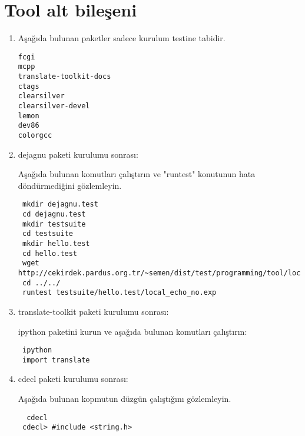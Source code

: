 \documentclass[a4paper,10pt]{article}
\begin{document}
\section{Tool alt bileşeni}
\begin{enumerate}
 \item Aşağıda bulunan paketler sadece kurulum testine tabidir.
\begin{verbatim}
fcgi
mcpp
translate-toolkit-docs
ctags
clearsilver
clearsilver-devel
lemon
dev86
colorgcc
\end{verbatim}
\item dejagnu paketi kurulumu sonrası:

Aşağıda bulunan komutları çalıştırın ve "runtest" konutunun hata döndürmediğini gözlemleyin.
\begin{verbatim}
 mkdir dejagnu.test
 cd dejagnu.test
 mkdir testsuite
 cd testsuite
 mkdir hello.test
 cd hello.test
 wget http://cekirdek.pardus.org.tr/~semen/dist/test/programming/tool/local_echo_no.exp
 cd ../../
 runtest testsuite/hello.test/local_echo_no.exp
\end{verbatim}

\item translate-toolkit paketi kurulumu sonrası:

ipython paketini kurun ve aşağıda bulunan komutları çalıştırın:
\begin{verbatim}
 ipython
 import translate
\end{verbatim}

\item cdecl paketi kurulumu sonrası:

Aşağıda bulunan kopmutun düzgün çalıştığını gözlemleyin.
\begin{verbatim}
  cdecl
 cdecl> #include <string.h>
\end{verbatim}

\end{enumerate}
\end{document}
